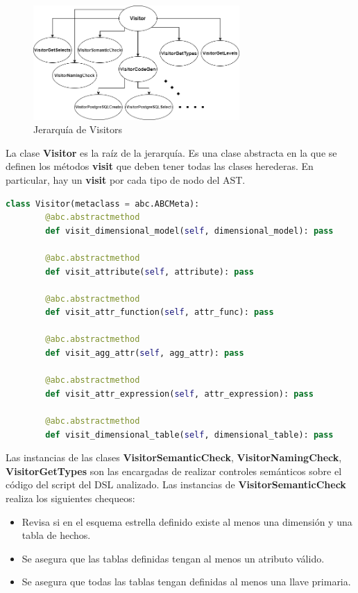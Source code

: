\begin{figure}[htb]
    \centering
    \includegraphics[width=0.7\textwidth]{Graphics/visitorfixed.drawio.png}
    \caption{Jerarqu\'ia de Visitors}
    \label{fig:visitors}
\end{figure}

La clase \textbf{Visitor} es la ra\'iz de la jerarqu\'ia. Es una clase abstracta en la que se definen los m\'etodos 
\textbf{visit} que deben tener todas las clases herederas. En particular, hay un \textbf{visit} por cada tipo de 
nodo del AST. 

\begin{lstlisting}[label={code:visitors}, caption={Clase Visitor}, language={python}]
    class Visitor(metaclass = abc.ABCMeta):
        @abc.abstractmethod
        def visit_dimensional_model(self, dimensional_model): pass 

        @abc.abstractmethod
        def visit_attribute(self, attribute): pass

        @abc.abstractmethod
        def visit_attr_function(self, attr_func): pass

        @abc.abstractmethod
        def visit_agg_attr(self, agg_attr): pass

        @abc.abstractmethod
        def visit_attr_expression(self, attr_expression): pass

        @abc.abstractmethod
        def visit_dimensional_table(self, dimensional_table): pass
\end{lstlisting}

Las instancias de las clases \textbf{VisitorSemanticCheck}, \textbf{VisitorNamingCheck}, \textbf{VisitorGetTypes} 
son las encargadas de realizar
controles sem\'anticos sobre el c\'odigo del script del DSL analizado. Las instancias de \textbf{VisitorSemanticCheck} realiza los siguientes 
chequeos:

\begin{itemize}
    \item Revisa si en el esquema estrella definido existe al menos una dimensi\'on y una tabla de hechos.
    \item Se asegura que las tablas definidas tengan al menos un atributo v\'alido.
    \item Se asegura que todas las tablas tengan definidas al menos una llave primaria.
\end{itemize}

